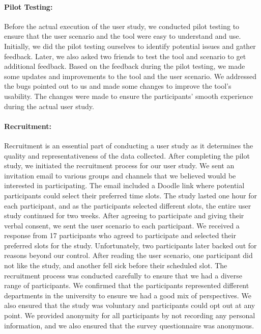 \paragraph{Pilot Testing:}
Before the actual execution of the user study, we conducted pilot testing to ensure that the user scenario and the tool were easy to understand and use. 
Initially, we did the pilot testing ourselves to identify potential issues and gather feedback. 
Later, we also asked two friends to test the tool and scenario to get additional feedback.
Based on the feedback during the pilot testing, we made some updates and improvements to the tool and the user scenario. 
We addressed the bugs pointed out to us and made some changes to improve the tool's usability. 
The changes were made to ensure the participants' smooth experience during the actual user study.

\paragraph{Recruitment:}
Recruitment is an essential part of conducting a user study as it determines the quality and representativeness of the data collected. 
After completing the pilot study, we initiated the recruitment process for our user study. 
We sent an invitation email to various groups and channels that we believed would be interested in participating. 
The email included a Doodle link where potential participants could select their preferred time slots.
The study lasted one hour for each participant, and as the participants selected different slots, the entire user study continued for two weeks. 
After agreeing to participate and giving their verbal consent, we sent the user scenario to each participant.
We received a response from 17 participants who agreed to participate and selected their preferred slots for the study. 
Unfortunately, two participants later backed out for reasons beyond our control. 
After reading the user scenario, one participant did not like the study, and another fell sick before their scheduled slot.
The recruitment process was conducted carefully to ensure that we had a diverse range of participants. 
We confirmed that the participants represented different departments in the university to ensure we had a good mix of perspectives. 
We also ensured that the study was voluntary and participants could opt out at any point. 
We provided anonymity for all participants by not recording any personal information, and we also ensured that the survey questionnaire was anonymous.


